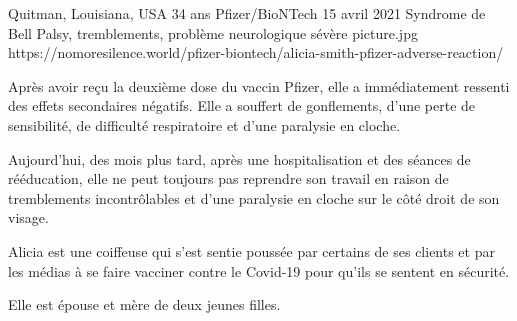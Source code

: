 {Quitman, Louisiana, USA}
{34 ans}
{Pfizer/BioNTech}
{15 avril 2021}
{Syndrome de Bell Palsy, tremblements, problème neurologique sévère}
{picture.jpg}
{https://nomoresilence.world/pfizer-biontech/alicia-smith-pfizer-adverse-reaction/}
{

Après avoir reçu la deuxième dose du vaccin Pfizer, elle a immédiatement
ressenti des effets secondaires négatifs. Elle a souffert de gonflements, d'une
perte de sensibilité, de difficulté respiratoire et d'une paralysie en cloche.

Aujourd'hui, des mois plus tard, après une hospitalisation et des séances de
rééducation, elle ne peut toujours pas reprendre son travail en raison de
tremblements incontrôlables et d'une paralysie en cloche sur le côté droit de
son visage.

Alicia est une coiffeuse qui s'est sentie poussée par certains de ses clients et
par les médias à se faire vacciner contre le Covid-19 pour qu'ils se sentent en
sécurité.

Elle est épouse et mère de deux jeunes filles.

}
